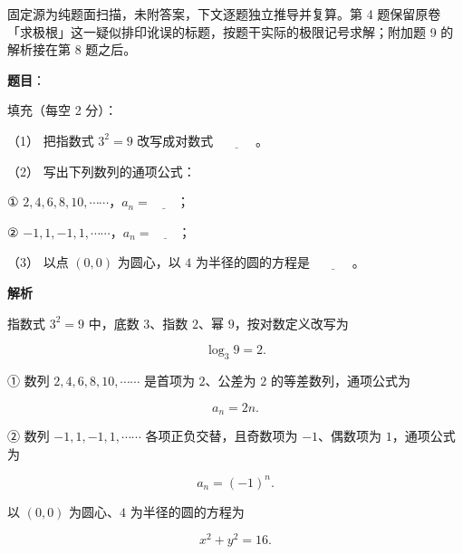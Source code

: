 

\begin{gktip}
固定源为纯题面扫描，未附答案，下文逐题独立推导并复算。第 4 题保留原卷「求极根」这一疑似排印讹误的标题，按题干实际的极限记号求解；附加题 9 的解析接在第 8 题之后。
\end{gktip}

\begin{answer}

\textbf{题目}：

填充（每空 2 分）：

（1） 把指数式 $3^2=9$ 改写成对数式 $\underline{\hspace{3em}}$。

（2） 写出下列数列的通项公式：

① $2,4,6,8,10,\cdots\cdots$，$a_n=\underline{\hspace{2em}}$；

② $-1,1,-1,1,\cdots\cdots$，$a_n=\underline{\hspace{2em}}$；

（3） 以点 $(0,0)$ 为圆心，以 $4$ 为半径的圆的方程是 $\underline{\hspace{3em}}$。

\textbf{解析}


指数式 $3^2=9$ 中，底数 $3$、指数 $2$、幂 $9$，按对数定义改写为

\nopagebreak[4]
\[
\log_3 9=2.
\]


① 数列 $2,4,6,8,10,\cdots\cdots$ 是首项为 $2$、公差为 $2$ 的等差数列，通项公式为

\nopagebreak[4]
\[
a_n=2n.
\]

② 数列 $-1,1,-1,1,\cdots\cdots$ 各项正负交替，且奇数项为 $-1$、偶数项为 $1$，通项公式为

\nopagebreak[4]
\[
a_n=(-1)^n.
\]


以 $(0,0)$ 为圆心、$4$ 为半径的圆的方程为

\nopagebreak[4]
\[
x^2+y^2=16.
\]




\end{answer}

